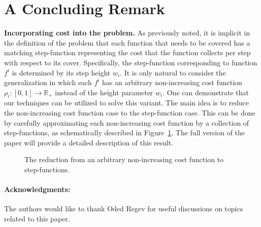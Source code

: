 \documentclass[11pt]{article}
\theoremstyle{plain}
\theoremstyle{definition}
\newcommand{\bbR}{\mathbb{R}}
\begin{document}
\section{A Concluding Remark} \label{sec:Remarks}

{\bf Incorporating cost into the problem.} As previously noted, it
is implicit in the definition of the problem that each function
that needs to be covered has a matching step-function representing
the cost that the function collects per step with respect to its
cover. Specifically, the step-function corresponding to function
$f^i$ is determined by its step height $w_i$. It is only natural
to consider the generalization in which each $f^i$ has an
arbitrary non-increasing cost function $\rho_i: [0,1] \rightarrow
\bbR_{+}$ instead of the height parameter $w_i$. One can
demonstrate that our techniques can be utilized to solve this
variant. The main idea is to reduce the non-increasing cost
function case to the step-function case. This can be done by
carefully approximating each non-increasing cost function by a
collection of step-functions, as schematically described in
Figure~\ref{fig:CostfuncGeneral}. The full version of the paper
will provide a detailed description of this result.

\begin{figure}[!hbt]
\centerline{  }
\caption{The reduction from an arbitrary non-increasing cost
function to step-functions.} \label{fig:CostfuncGeneral}
\end{figure}


\paragraph{Acknowledgments:}
The authors would like to thank Oded Regev for useful discussions
on topics related to this paper.
\end{document}
